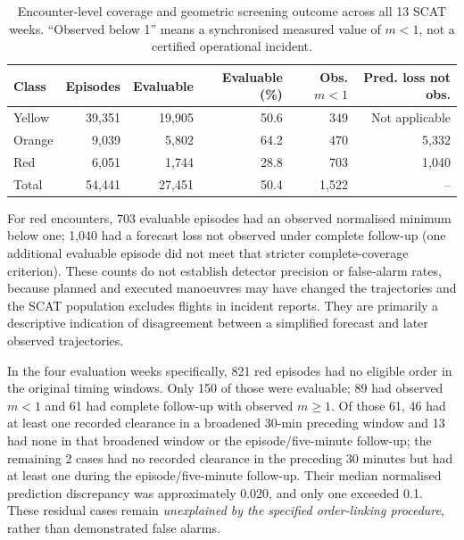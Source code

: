 \documentclass[pdflatex,sn-mathphys-num]{sn-jnl}
\begin{document}
\begin{table}[t]
\caption{Encounter-level coverage and geometric screening outcome across all 13 SCAT weeks. ``Observed below 1'' means a synchronised measured value of $m<1$, not a certified operational incident.}\label{tab:coverage}
\begin{tabular}{@{}lrrrrr@{}}
\toprule
Class & Episodes & Evaluable & Evaluable (\%) & Obs. $m<1$ & Pred. loss not obs.\\
\midrule
Yellow & 39,351 & 19,905 & 50.6 & 349 & Not applicable\\
Orange & 9,039 & 5,802 & 64.2 & 470 & 5,332\\
Red & 6,051 & 1,744 & 28.8 & 703 & 1,040\\
\midrule
Total & 54,441 & 27,451 & 50.4 & 1,522 & --\\
\bottomrule
\end{tabular}
\end{table}

For red encounters, 703 evaluable episodes had an observed normalised minimum below one; 1,040 had a forecast loss not observed under complete follow-up (one additional evaluable episode did not meet that stricter complete-coverage criterion). These counts do not establish detector precision or false-alarm rates, because planned and executed manoeuvres may have changed the trajectories and the SCAT population excludes flights in incident reports. They are primarily a descriptive indication of disagreement between a simplified forecast and later observed trajectories.

In the four evaluation weeks specifically, 821 red episodes had no eligible order in the original timing windows. Only 150 of those were evaluable; 89 had observed $m<1$ and 61 had complete follow-up with observed $m\ge1$. Of those 61, 46 had at least one recorded clearance in a broadened 30-min preceding window and 13 had none in that broadened window or the episode/five-minute follow-up; the remaining 2 cases had no recorded clearance in the preceding 30 minutes but had at least one during the episode/five-minute follow-up. Their median normalised prediction discrepancy was approximately 0.020, and only one exceeded 0.1. These residual cases remain \emph{unexplained by the specified order-linking procedure}, rather than demonstrated false alarms.
\end{document}
